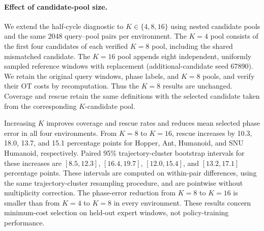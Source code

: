 \paragraph{Effect of candidate-pool size.}
We extend the half-cycle diagnostic to $K\in\{4,8,16\}$ using nested
candidate pools and the same 2048 query--pool pairs per environment.
The $K=4$ pool consists of the first four candidates of each verified
$K=8$ pool, including the shared mismatched candidate. The $K=16$ pool
appends eight independent, uniformly sampled reference windows with
replacement (additional-candidate seed 67890). We retain the original
query windows, phase labels, and $K=8$ pools, and verify their OT costs
by recomputation. Thus the $K=8$ results are unchanged.
Coverage and rescue retain the same definitions with the selected
candidate taken from the corresponding $K$-candidate pool.



Increasing $K$ improves coverage and rescue rates and reduces mean
selected phase error in all four environments. From $K=8$ to $K=16$,
rescue increases by 10.3, 18.0, 13.7, and 15.1 percentage points for
Hopper, Ant, Humanoid, and SNU Humanoid, respectively. Paired 95\%
trajectory-cluster bootstrap intervals for these increases are
$[8.5,12.3]$, $[16.4,19.7]$, $[12.0,15.4]$, and $[13.2,17.1]$ percentage
points. These intervals are computed on within-pair differences,
using the same trajectory-cluster resampling procedure, and are
pointwise without multiplicity correction. The phase-error reduction
from $K=8$ to $K=16$ is smaller than from $K=4$ to $K=8$ in every
environment. These results concern minimum-cost selection on held-out
expert windows, not policy-training performance.
